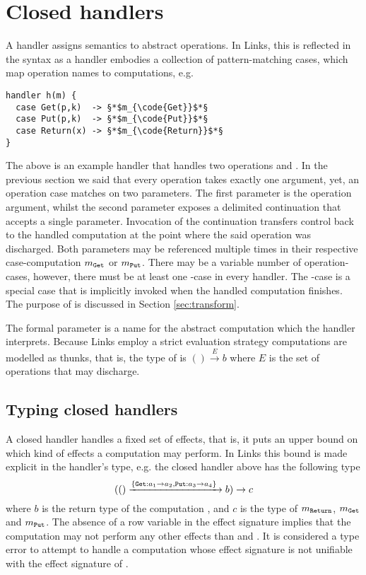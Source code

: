\section{Closed handlers}\label{sec:closedhandlers}
A handler assigns semantics to abstract operations. In Links, this is reflected in the syntax as a handler embodies a collection of pattern-matching cases, which map operation names to computations, e.g.
\begin{lstlisting}[style=links]
handler h(m) {
  case Get(p,k)  -> §*$m_{\code{Get}}$*§
  case Put(p,k)  -> §*$m_{\code{Put}}$*§
  case Return(x) -> §*$m_{\code{Return}}$*§
}
\end{lstlisting}
The above is an example handler  that handles two operations  and .
In the previous section we said that every operation takes exactly one argument, yet, an operation case matches on two parameters. The first parameter  is the operation argument, whilst the second parameter  exposes a delimited continuation that accepts a single parameter. Invocation of the continuation transfers control back to the handled computation  at the point where the said operation was discharged. Both parameters may be referenced multiple times in their respective case-computation $m_{\texttt{Get}}$ or $m_{\texttt{Put}}$.
There may be a variable number of operation-cases, however, there must be at least one -case in every handler. The -case is a special case that is implicitly invoked when the handled computation  finishes. The purpose of  is discussed in Section \ref{sec:transform}.

The formal parameter  is a name for the abstract computation which the handler interprets. Because Links employ a strict evaluation strategy computations are modelled as thunks, that is, the type of  is $() \xrightarrow{E} b$ where $E$ is the set of operations that  may discharge.

\subsection{Typing closed handlers}
A closed handler handles a fixed set of effects, that is, it puts an upper bound on which kind of effects a computation may perform. In Links this bound is made explicit in the handler's type, e.g. the closed handler  above has the following type
\[ (() \xrightarrow{ \{\texttt{Get}: a_1 \to a_2, \texttt{Put}: a_3 \to a_4 \}\;} b) \to c \]
where $b$ is the return type of the computation , and $c$ is the type of $m_{\texttt{Return}}$, $m_{\texttt{Get}}$ and $m_{\texttt{Put}}$.
The absence of a row variable in the effect signature implies that the computation  may not perform any other effects than  and . It is considered a type error to attempt to handle a computation whose effect signature is not unifiable with the effect signature of .

